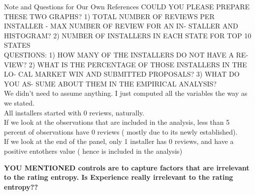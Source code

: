 \documentclass[msom,blindrev]{informs3}
\begin{document}
\begin{APPENDIX}{Note and Questions for Our Own References }
COULD YOU PLEASE PREPARE THESE TWO GRAPHS? 1) TOTAL NUMBER
OF REVIEWS PER INSTALLER - MAX NUMBER OF REVIEW FOR AN IN-
STALLER AND HISTOGRAM? 2) NUMBER OF INSTALLERS IN EACH STATE
FOR TOP 10 STATES \\
QUESTIONS: 1) HOW MANY OF THE INSTALLERS DO NOT HAVE A RE-
VIEW? 2) WHAT IS THE PERCENTAGE OF THOSE INSTALLERS IN THE LO-
CAL MARKET WIN AND SUBMITTED PROPOSALS? 3) WHAT DO YOU AS-
SUME ABOUT THEM IN THE EMPIRICAL ANALYSIS? \\
We didn't need to assume anything. I just computed all the variables the way as we stated. \\
All installers started with 0 reviews, naturally. \\
If we look at the observations that are included in the analysis, less than 5 percent of observations have 0 reviews ( mostly due to its newly established). \\
If we look at the end of the panel, only 1 installer has 0 reviews, and have a positive entothers value ( hence is included in the analysis)



\textbf{YOU MENTIONED controls are to capture factors that are irrelevant to the rating entropy. Is Experience really irrelevant to the rating entropy?? }

\end{APPENDIX}


\clearpage
%
%
%











\end{document}
